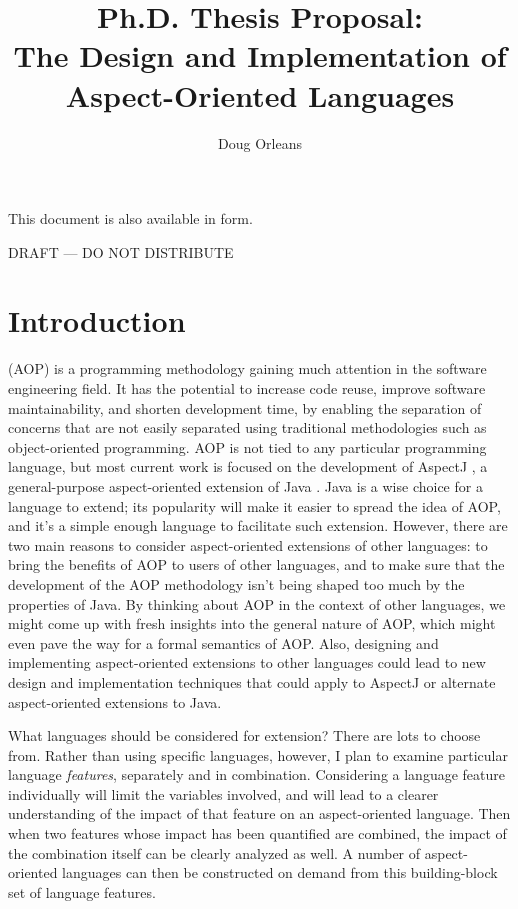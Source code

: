 \documentclass[12pt]{article}
\title{Ph.D. Thesis Proposal: \\
The Design and Implementation of Aspect-Oriented Languages}
\author{Doug Orleans}
\begin{document}
\begin{htmlonly}
This document is also available in
 form.
\end{htmlonly}

\maketitle


\begin{center}
DRAFT --- DO NOT DISTRIBUTE
\end{center}

\section{Introduction}

 (AOP) \cite{AOP} is a programming
methodology gaining much attention in the software engineering field.
It has the potential to increase code reuse, improve software
maintainability, and shorten development time, by enabling the
separation of concerns that are not easily separated using traditional
methodologies such as object-oriented programming.  AOP is not tied to
any particular programming language, but most current work is focused
on the development of AspectJ \cite{AspectJ}, a general-purpose
aspect-oriented extension of Java \cite{JLS}.  Java is a wise choice for a
language to extend; its popularity will make it easier to spread the
idea of AOP, and it's a simple enough language to facilitate such
extension.  However, there are two main reasons to consider
aspect-oriented extensions of other languages: to bring the benefits
of AOP to users of other languages, and to make sure that the
development of the AOP methodology isn't being shaped too much by the
properties of Java.  By thinking about AOP in the context of other
languages, we might come up with fresh insights into the general
nature of AOP, which might even pave the way for a formal semantics of
AOP.  Also, designing and implementing aspect-oriented extensions to
other languages could lead to new design and implementation techniques
that could apply to AspectJ or alternate aspect-oriented extensions to
Java.

What languages should be considered for extension?  There are lots to
choose from.  Rather than using specific languages, however, I plan to
examine particular language \emph{features}, separately and in
combination.  Considering a language feature individually will limit
the variables involved, and will lead to a clearer understanding of
the impact of that feature on an aspect-oriented language.  Then when two
features whose impact has been quantified are combined, the impact of
the combination itself can be clearly analyzed as well.  A number of
aspect-oriented languages can then be constructed on demand from this
building-block set of language features.
\end{document}
